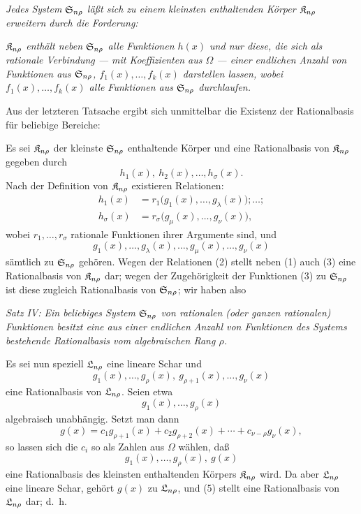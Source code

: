 \emph{Jedes System $\mathfrak{S}_{n\rho}$ läßt sich zu einem kleinsten enthaltenden Körper $\mathfrak{K}_{n\rho}$ erweitern durch die Forderung:}

\emph{$\mathfrak{K}_{n\rho}$ enthält neben $\mathfrak{S}_{n\rho}$ alle Funktionen $h(x)$ und nur diese, die sich als rationale Verbindung --- mit Koeffizienten aus $\Omega$ --- einer endlichen Anzahl von Funktionen aus $\mathfrak{S}_{n\rho}$, $f_1(x),\ldots,f_k(x)$ darstellen lassen, wobei $f_1(x),\ldots,f_k(x)$ alle Funktionen aus $\mathfrak{S}_{n\rho}$ durchlaufen.}

Aus der letzteren Tatsache ergibt sich unmittelbar die Existenz der Rationalbasis für beliebige Bereiche:

Es sei $\mathfrak{K}_{n\rho}$ der kleinste $\mathfrak{S}_{n\rho}$ enthaltende Körper und eine Rationalbasis von $\mathfrak{K}_{n\rho}$ gegeben durch
\begin{equation}
  h_1(x),\ h_2(x),\ldots,h_\sigma(x).
\tag{1}
\end{equation}
Nach der Definition von $\mathfrak{K}_{n\rho}$ existieren Relationen:
\begin{equation}
\begin{aligned}
 h_1(x)&=r_1\bigl(g_1(x),\ldots,g_\lambda(x)\bigr);\ldots;\\
 h_\sigma(x)&=r_\sigma\bigl(g_\mu(x),\ldots,g_\nu(x)\bigr),
\end{aligned}
\tag{2}
\end{equation}
wobei $r_1,
\ldots,r_\sigma$ rationale Funktionen ihrer Argumente sind, und
\begin{equation}
  g_1(x),\ldots,g_\lambda(x),\ldots,
  g_\mu(x),\ldots,g_\nu(x)
\tag{3}
\end{equation}
sämtlich zu $\mathfrak{S}_{n\rho}$ gehören. Wegen der Relationen (2) stellt neben (1) auch (3) eine Rationalbasis von $\mathfrak{K}_{n\rho}$ dar; wegen der Zugehörigkeit der Funktionen (3) zu $\mathfrak{S}_{n\rho}$ ist diese zugleich Rationalbasis von $\mathfrak{S}_{n\rho}$; wir haben also

\emph{Satz IV: Ein beliebiges System $\mathfrak{S}_{n\rho}$ von rationalen (oder ganzen rationalen) Funktionen besitzt eine aus einer endlichen Anzahl von Funktionen des Systems bestehende Rationalbasis vom algebraischen Rang $\rho$.}

Es sei nun speziell $\mathfrak{L}_{n\rho}$ eine lineare Schar und
\begin{equation}
  g_1(x),\ldots,g_\rho(x),\ g_{\rho+1}(x),\ldots,g_\nu(x)
\tag{4}
\end{equation}
eine Rationalbasis von $\mathfrak{L}_{n\rho}$. Seien etwa
\[
  g_1(x),\ldots,g_\rho(x)
\]
algebraisch unabhängig. Setzt man dann
\[
  g(x)=c_1g_{\rho+1}(x)+c_2g_{\rho+2}(x)+\cdots+c_{\nu-\rho}g_\nu(x),
\]
so lassen sich die $c_i$ so als Zahlen aus $\Omega$ wählen, daß
\begin{equation}
  g_1(x),\ldots,g_\rho(x),\ g(x)
\tag{5}
\end{equation}
eine Rationalbasis des kleinsten enthaltenden Körpers $\mathfrak{K}_{n\rho}$ wird. Da aber $\mathfrak{L}_{n\rho}$ eine lineare Schar, gehört $g(x)$ zu $\mathfrak{L}_{n\rho}$, und (5) stellt eine Rationalbasis von $\mathfrak{L}_{n\rho}$ dar; d.~h.

